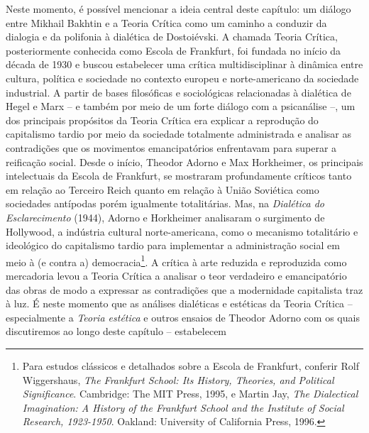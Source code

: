 Neste momento, é possível mencionar a ideia central deste capítulo: um
diálogo entre Mikhail Bakhtin e a Teoria Crítica como um caminho a
conduzir da dialogia e da polifonia à dialética de Dostoiévski. A
chamada Teoria Crítica, posteriormente conhecida como Escola de
Frankfurt, foi fundada no início da década de 1930 e buscou estabelecer
uma crítica multidisciplinar à dinâmica entre cultura, política e
sociedade no contexto europeu e norte-americano da sociedade industrial.
A partir de bases filosóficas e sociológicas relacionadas à dialética de
Hegel e Marx -- e também por meio de um forte diálogo com a psicanálise
--, um dos principais propósitos da Teoria Crítica era explicar a
reprodução do capitalismo tardio por meio da sociedade totalmente
administrada e analisar as contradições que os movimentos emancipatórios
enfrentavam para superar a reificação social. Desde o início, Theodor
Adorno e Max Horkheimer, os principais intelectuais da Escola de
Frankfurt, se mostraram profundamente críticos tanto em relação ao
Terceiro Reich quanto em relação à União Soviética como sociedades
antípodas porém igualmente totalitárias. Mas, na \emph{Dialética do
Esclarecimento} (1944), Adorno e Horkheimer analisaram o surgimento de
Hollywood, a indústria cultural norte-americana, como o mecanismo
totalitário e ideológico do capitalismo tardio para implementar a
administração social em meio à (e contra a) democracia\footnote{
  Para estudos clássicos e detalhados sobre a Escola de Frankfurt,
  conferir Rolf Wiggershaus, \emph{The Frankfurt School: Its
  History, Theories, and Political Significance}. Cambridge: The MIT
  Press, 1995, e Martin Jay, \emph{The Dialectical Imagination: A
  History of the Frankfurt School and the Institute of Social Research,
  1923-1950}. Oakland: University of California Press, 1996.}\label{para-estudos-cluxe1ssicos-e-detalhados-sobre-a-escola-de-frankfurt-conferir-rolf-wiggershaus-the-frankfurt-school-its-history-theories-and-political-significance.-cambridge-the-mit-press-1995-e-martin-jay-the-dialectical-imagination-a-history-of-the-frankfurt-school-and-the-institute-of-social-research-1923-1950.-oakland-university-of-california-press-1996.}.
A crítica à arte reduzida e reproduzida como mercadoria levou a Teoria
Crítica a analisar o teor verdadeiro e emancipatório das obras de modo a
expressar as contradições que a modernidade capitalista traz à luz. É
neste momento que as análises dialéticas e estéticas da Teoria Crítica
-- especialmente a \emph{Teoria estética} e outros ensaios de Theodor
Adorno com os quais discutiremos ao longo deste capítulo -- estabelecem
